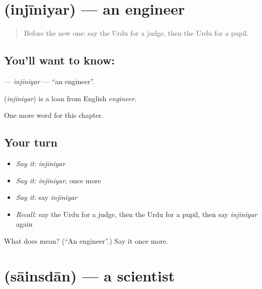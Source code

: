\section[\texorpdfstring{\ur{انجینئر} (injīniyar)}{انجینئر (injīniyar)}]{ (injīniyar) — an engineer}

\label{lesson:UR-C262-injiniyar}



\begin{quote}
Before the new one: say the Urdu for a judge, then the Urdu for a pupil.
\end{quote}

\subsection*{You'll want to know: }
\textbf{} — \emph{injīniyar} — \textquotedblleft{}an engineer\textquotedblright{}.

\begin{cousinweb}
\textbf{} (\emph{injīniyar}) is a loan from English \emph{engineer}.
\end{cousinweb}

\begin{grammarlens}[title={What you've built}]
One more word for this chapter.
\end{grammarlens}

\subsection*{Your turn}
\begin{itemize}
\raggedright
  \item \emph{Say it:} \emph{injīniyar}
  \item \emph{Say it:} \emph{injīniyar}, once more
  \item \emph{Say it:} say \emph{injīniyar}
  \item \emph{Recall:} say the Urdu for a judge, then the Urdu for a pupil, then say \emph{injīniyar} again
\end{itemize}

\begin{tcolorbox}[breakable,colback=teal!4,colframe=teal!35!black,title={Before you move on}]
What does  mean? (\textquotedblleft{}An engineer\textquotedblright{}.) Say it once more.
\end{tcolorbox}
\section[\texorpdfstring{\ur{سائنسدان} (sāinsdān)}{سائنسدان (sāinsdān)}]{ (sāinsdān) — a scientist}

